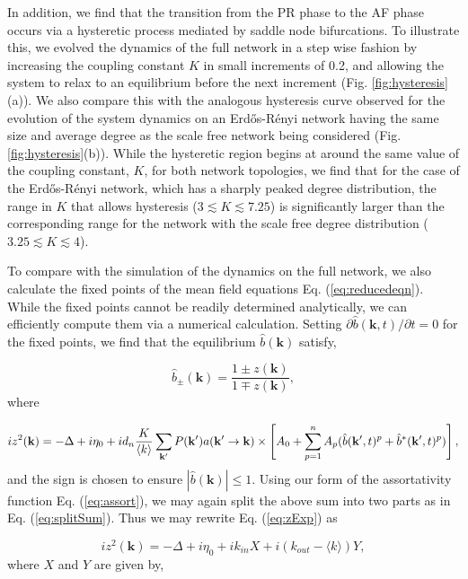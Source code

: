 \documentclass[%
 aip,
 sd,%
 amsmath,amssymb,
 reprint,%
]{revtex4-1}
\begin{document}
In addition, we find that the transition from the PR phase to the AF phase occurs via a hysteretic process mediated by saddle node bifurcations. To illustrate this, we evolved the dynamics of the full network in a step wise fashion by increasing the coupling constant $K$ in small increments of 0.2, and allowing the system to relax to an equilibrium before the next increment (Fig. \ref{fig:hysteresis}(a)). We also compare this with the analogous hysteresis curve observed for the evolution of the system dynamics on an Erd\H{o}s-R\'{e}nyi network having the same size and average degree as the scale free network being considered (Fig. \ref{fig:hysteresis}(b)). While the hysteretic region begins at around the same value of the coupling constant, $K$, for both network topologies, we find that for the case of the Erd\H{o}s-R\'{e}nyi network, which has a sharply peaked degree distribution, the range in $K$ that allows hysteresis ($3\lesssim K \lesssim 7.25$) is significantly larger than the corresponding range for the network with the scale free degree distribution ($3.25 \lesssim K \lesssim 4$). 

To compare with the simulation of the dynamics on the full network, we also calculate the fixed points of the mean field equations Eq. (\ref{eq:reducedeqn}). While the fixed points cannot be readily determined analytically, we can efficiently compute them via a numerical calculation. Setting $\partial \hat b(\mathbf{k}, t)/\partial t=0$ for the fixed points, we find that the equilibrium $\hat b(\mathbf{k})$ satisfy,

\begin{equation} \label{eq:equilB}
\hat b_\pm(\mathbf{k}) = \frac{1 \pm z(\mathbf{k})}{1 \mp z(\mathbf{k})},
\end{equation}
where

\begin{dmath} \label{eq:zExp}
i z^2(\mathbf{k}) = - \Delta + i \eta_0 + i d_n \frac{K}{\langle k \rangle} \sum_{\mathbf{k'}} P(\mathbf{k'}) a({\mathbf{k'} \rightarrow \mathbf{k}}) \\ \times  \left[ A_0 + \sum_{p=1}^n A_p (\hat b(\mathbf{k'}, t)^p + \hat b^*(\mathbf{k'}, t)^p) \right],
\end{dmath}
and the sign is chosen to ensure $|\hat b(\mathbf{k})|\leq 1$. 
Using our form of the assortativity function Eq. (\ref{eq:assort}), we may again split the above sum into two parts as in Eq. (\ref{eq:splitSum}). Thus we may rewrite Eq. (\ref{eq:zExp}) as 

\begin{equation} \label{eq:zExp2}
i z^2(\mathbf{k}) = - \Delta + i \eta_0 + i k_{in} X + i (k_{out} - \langle k \rangle) Y,
\end{equation}
where $X$ and $Y$ are given by,
\end{document}
